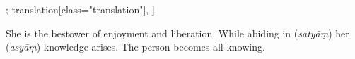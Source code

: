 \begin{alignment}[
    texts=edition[class="edition"];
    translation[class="translation"],
  ]
\begin{translation}
\begin{tlate}
\indent She  is the bestower of enjoyment and liberation. While abiding in (\textit{satyāṃ}) her (\textit{asyāṃ}) knowledge arises. The person becomes all-knowing. \vspace*{\fill}
    \end{tlate}
    \ekdpb*{}
   \end{translation}
 \end{alignment}
